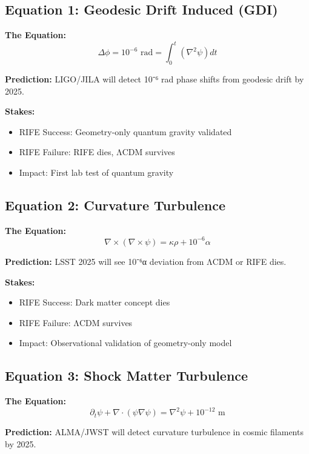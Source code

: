 \documentclass[11pt]{report}
\begin{document}
\subsection{Equation 1: Geodesic Drift Induced (GDI)}
\textbf{The Equation:}
\begin{equation}
\Delta\phi = 10^{-6} \text{ rad} = \int_0^t (\nabla^2\psi) dt
\end{equation}

\textbf{Prediction:} LIGO/JILA will detect 10⁻⁶ rad phase shifts from geodesic drift by 2025.

\textbf{Stakes:}
\begin{itemize}
\item RIFE Success: Geometry-only quantum gravity validated
\item RIFE Failure: RIFE dies, ΛCDM survives
\item Impact: First lab test of quantum gravity
\end{itemize}

\subsection{Equation 2: Curvature Turbulence}
\textbf{The Equation:}
\begin{equation}
\nabla \times (\nabla \times \psi) = \kappa\rho + 10^{-6}\alpha
\end{equation}

\textbf{Prediction:} LSST 2025 will see 10⁻⁶α deviation from ΛCDM or RIFE dies.

\textbf{Stakes:}
\begin{itemize}
\item RIFE Success: Dark matter concept dies
\item RIFE Failure: ΛCDM survives
\item Impact: Observational validation of geometry-only model
\end{itemize}

\subsection{Equation 3: Shock Matter Turbulence}
\textbf{The Equation:}
\begin{equation}
\partial_t\psi + \nabla \cdot (\psi\nabla\psi) = \nabla^2\psi + 10^{-12} \text{ m}
\end{equation}

\textbf{Prediction:} ALMA/JWST will detect curvature turbulence in cosmic filaments by 2025.
\end{document}
